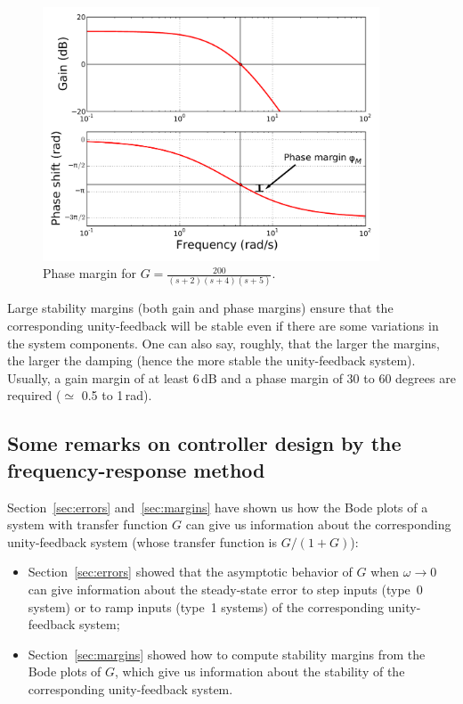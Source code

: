 \documentclass[a4paper,11pt]{report}
\theoremstyle{definition}
\begin{document}
\begin{figure}[H]
  \centering
  \includegraphics[width=10cm]{fig/bode-phase-margin-mod.pdf}
  \caption{Phase margin for $G=\frac{200}{(s+2)(s+4)(s+5)}$.}
  \label{fig:bode-phase-margin}
\end{figure}

Large stability margins (both gain and phase margins) ensure that the
corresponding unity-feedback will be stable even if there are some
variations in the system components. One can also say, roughly, that
the larger the margins, the larger the damping (hence the more stable
the unity-feedback system). Usually, a gain margin of at least 6\,dB
and a phase margin of 30 to 60 degrees are required ($\simeq$ 0.5 to
1\,rad).


\subsection{Some remarks on controller design by the
  frequency-response method}

Section~\ref{sec:errors} and~\ref{sec:margins} have shown us how the
Bode plots of a system with transfer function $G$ can give us
information about the corresponding unity-feedback system (whose
transfer function is $G/(1+G)$):
\begin{itemize}
\item Section~\ref{sec:errors} showed that the asymptotic behavior of
  $G$ when $\omega\to 0$ can give information about the
  steady-state error to step inputs (type~0 system) or to ramp inputs
  (type~1 systems) of the corresponding unity-feedback system;
\item Section~\ref{sec:margins} showed how to compute stability
  margins from the Bode plots of $G$, which give us information about
  the stability of the corresponding unity-feedback system.
\end{itemize}
\end{document}
